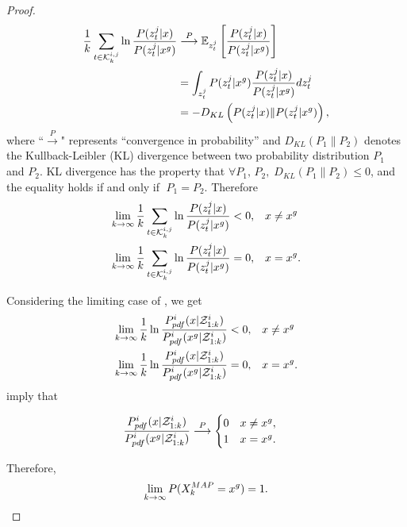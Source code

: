 \begin{proof}
		\small\begin{subequations}\label{eqn:cmp_lim2}
			\begin{align}
			\frac{1}{k}\sum\limits_{t\in\mathcal{K}^{i,j}_{k}}\ln\frac{P(z^j_t|x)}{P(z^j_t|x^g)}&\overset{P}{\longrightarrow}\mathbb{E}_{z^j_t} \left[\frac{P(z^j_t|x)}{P(z^j_t|x^g)}\right]\\
			&=\int_{z^j_t} P(z^j_t|x^g)\frac{P(z^j_t|x)}{P(z^j_t|x^g)} dz^j_t\\
			&=-D_{KL}\left(P(z^j_t|x)\|P(z^j_t|x^g)\right),
			\end{align}
		\end{subequations}\normalsize		
		where ``$\overset{P}{\longrightarrow}$" represents ``convergence in probability'' and $D_{KL}(P_1\|P_2)$ denotes the Kullback-Leibler (KL) divergence between two probability distribution $P_1$ and $P_2$.
		KL divergence has the property that $\forall P_1,\,P_2, \; D_{KL}(P_1\|P_2)\leq 0$, and the equality holds if and only if $\; P_1=P_2.$ Therefore
		\small\begin{align*}
		\lim\limits_{k\rightarrow \infty}\frac{1}{k}\sum\limits_{t\in\mathcal{K}^{i,j}_{k}}\ln\frac{P(z^j_t|x)}{P(z^j_t|x^g)}<0,&\quad x\neq x^g\\
		\lim\limits_{k\rightarrow \infty}\frac{1}{k}\sum\limits_{t\in\mathcal{K}^{i,j}_{k}}\ln\frac{P(z^j_t|x)}{P(z^j_t|x^g)}=0,&\quad x= x^g.
		\end{align*}\normalsize
		
		Considering the limiting case of , we get
		\small\begin{align}
		\lim\limits_{k\rightarrow \infty}\frac{1}{k}\ln\frac{P^i_{pdf}(x|\mathcal{Z}^i_{1:k})}{P^i_{pdf}(x^g|\mathcal{Z}^i_{1:k})}<0,&\quad x\neq x^g\label{subeqn:limit1}\\
		\lim\limits_{k\rightarrow \infty}\frac{1}{k}\ln\frac{P^i_{pdf}(x|\mathcal{Z}^i_{1:k})}{P^i_{pdf}(x^g|\mathcal{Z}^i_{1:k})}=0,&\quad x= x^g\label{subeqn:limit2}.
		\end{align}\normalsize
		 imply that
		
		\small\begin{equation*}
		\frac{P^i_{pdf}(x|\mathcal{Z}^i_{1:k})}{P^i_{pdf}(x^g|\mathcal{Z}^i_{1:k})}\overset{P}{\longrightarrow}
		\begin{cases}
		0\quad x\neq x^g,\\
		1\quad x= x^g.
		\end{cases}		
		\end{equation*}\normalsize
		
		Therefore,
		\small\begin{equation*}
		\lim\limits_{k\rightarrow \infty}
		P(X_k^{MAP}=x^g)=1.
		\end{equation*}\normalsize		
	\end{proof}
	
